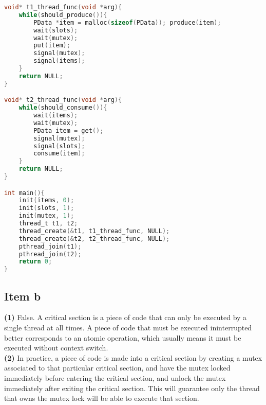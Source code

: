 {\begin{lstlisting}[language=C]
void* t1_thread_func(void *arg){
    while(should_produce()){
        PData *item = malloc(sizeof(PData)); produce(item);
        wait(slots);
        wait(mutex);
        put(item);
        signal(mutex);
        signal(items);
    }
    return NULL;
}

void* t2_thread_func(void *arg){
    while(should_consume()){
        wait(items);
        wait(mutex);
        PData item = get();
        signal(mutex);
        signal(slots);
        consume(item);
    }
    return NULL;
}

int main(){
    init(items, 0);
    init(slots, 1);
    init(mutex, 1);
    thread_t t1, t2;
    thread_create(&t1, t1_thread_func, NULL);
    thread_create(&t2, t2_thread_func, NULL);
    pthread_join(t1);
    pthread_join(t2);
    return 0;
}
\end{lstlisting}

\subsection{Item b}
\textbf{(1)} False. A critical section is a piece of code that can only be executed by a single thread at all times. A piece of code that must be executed ininterrupted better corresponds to an atomic operation, which usually means it must be executed without context switch.\\
\textbf{(2)} In practice, a piece of code is made into a critical section by creating a mutex associated to that particular critical section, and have the mutex locked immediately before entering the critical section, and unlock the mutex immediately after exiting the critical section. This will guarantee only the thread that owns the mutex lock will be able to execute that section.

}
